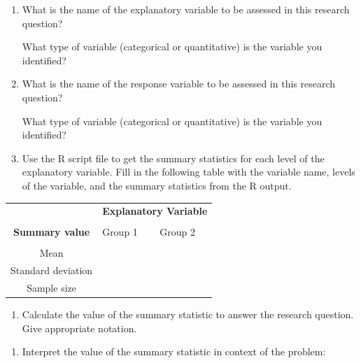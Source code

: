 \documentclass[
]{report}
\providecommand{\tightlist}{%
  \setlength{\itemsep}{0pt}\setlength{\parskip}{0pt}}
\begin{document}
\begin{enumerate}
\def\labelenumi{\alph{enumi}.}
\item
  What is the name of the explanatory variable to be assessed in this research question?
  \vspace{0.3in}

  What type of variable (categorical or quantitative) is the variable you identified?
  \vspace{0.3in}
\item
  What is the name of the response variable to be assessed in this research question?
  \vspace{0.3in}

  What type of variable (categorical or quantitative) is the variable you identified?
  \vspace{0.3in}
\item
  Use the R script file to get the summary statistics for each level of the explanatory variable. Fill in the following table with the variable name, levels of the variable, and the summary statistics from the R output.
\end{enumerate}

\begingroup
\setlength{\tabcolsep}{14pt}
\renewcommand{\arraystretch}{2}
\begin{center}
\begin{tabular}{|c|p{1in}|p{1in}|}
\hline
 & \multicolumn{2}{|c|}{\textbf{Explanatory Variable}} \\
 & \multicolumn{2}{|c|}{ } \\ \hline
\textbf{Summary value} & Group 1 & Group 2 \\
 & & \\ \hline
 Mean & & \\ \hline
 Standard deviation & & \\ \hline
 Sample size & & \\ \hline
\end{tabular}
\end{center}
\endgroup

\begin{enumerate}
\def\labelenumi{\alph{enumi}.}
\setcounter{enumi}{3}
\tightlist
\item
  Calculate the value of the summary statistic to answer the research question. Give appropriate notation.
\end{enumerate}

\vspace{0.4in}

\begin{enumerate}
\def\labelenumi{\alph{enumi}.}
\setcounter{enumi}{4}
\tightlist
\item
  Interpret the value of the summary statistic in context of the problem:
\end{enumerate}
\end{document}

